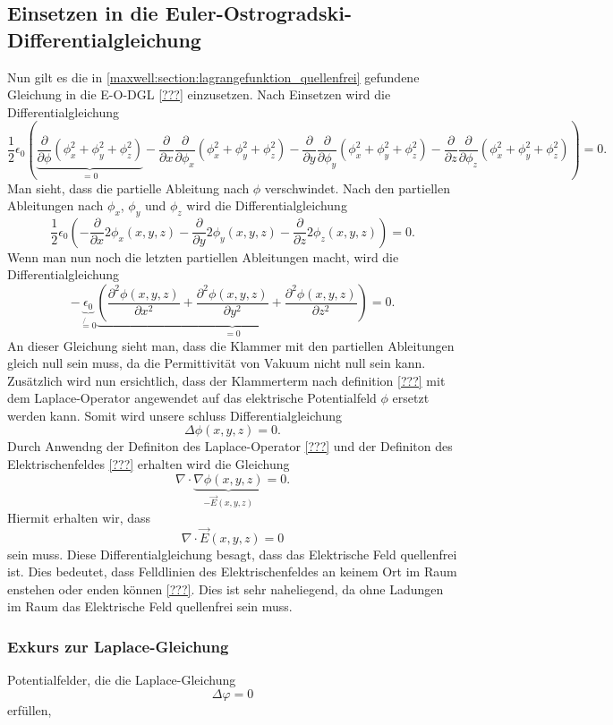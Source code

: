 \subsection{Einsetzen in die Euler-Ostrogradski-Differentialgleichung}
Nun gilt es die in \eqref{maxwell:section:lagrangefunktion_quellenfrei} gefundene Gleichung in die E-O-DGL \ref{???} einzusetzen.
Nach Einsetzen wird die Differentialgleichung
\[
\frac{1}{2}\epsilon_0\left(\underbrace{\frac{\partial}{\partial\phi}\left(\phi_x^2 + \phi_y^2 + \phi_z^2\right)}_{=0} - \frac{\partial}{\partial x}\frac{\partial}{\partial \phi_x}\left(\phi_x^2 + \phi_y^2 + \phi_z^2\right) - 
\frac{\partial}{\partial y}\frac{\partial}{\partial \phi_y}\left(\phi_x^2 + \phi_y^2 + \phi_z^2\right) - 
\frac{\partial}{\partial z}\frac{\partial}{\partial \phi_z}\left(\phi_x^2 + \phi_y^2 + \phi_z^2\right)\right)
=
0.
\]
Man sieht, dass die partielle Ableitung nach $\phi$ verschwindet.
Nach den partiellen Ableitungen nach $\phi_x$, $\phi_y$ und $\phi_z$ wird die Differentialgleichung
\[
\frac{1}{2}\epsilon_0\left(-\frac{\partial}{\partial x}2\phi_x(x,y,z) - \frac{\partial}{\partial y}2\phi_y(x,y,z) - \frac{\partial}{\partial z}2\phi_z(x,y,z)\right)
=
0.
\]
Wenn man nun noch die letzten partiellen Ableitungen macht, wird die Differentialgleichung
\begin{equation}
	- \underbrace{\epsilon_0}_{\not{=}0}\underbrace{\left(\frac{\partial^2\phi(x,y,z)}{\partial x^2} + \frac{\partial^2\phi(x,y,z)}{\partial y^2} + \frac{\partial^2\phi(x,y,z)}{\partial z^2}\right)}_{=0}
	=
	0.
	\label{maxwell:section:laplace_gleichung_1}
\end{equation}
An dieser Gleichung sieht man, dass die Klammer mit den partiellen Ableitungen gleich null sein muss, da die Permittivität von Vakuum nicht null sein kann.
Zusätzlich wird nun ersichtlich, dass der Klammerterm nach definition \ref{???} mit dem Laplace-Operator angewendet auf das elektrische Potentialfeld $\phi$ ersetzt werden kann.
Somit wird unsere schluss Differentialgleichung
\begin{equation}
	\Delta\phi(x,y,z)
	=
	0.
	\label{maxwell:section:laplace_gleichung_2}
\end{equation}
Durch Anwendng der Definiton des Laplace-Operator \ref{???} und der Definiton des Elektrischenfeldes \ref{???} erhalten wird die Gleichung
\[
\nabla\cdot\underbrace{\nabla\phi(x,y,z)}_{-\vec{E}(x,y,z)}
=
0.
\]
Hiermit erhalten wir, dass
\begin{equation}
	\nabla\cdot\vec{E}(x,y,z)
	=
	0
	\label{maxwell:section:e_feld_quellenfrei}
\end{equation}
sein muss. Diese Differentialgleichung besagt, dass das Elektrische Feld quellenfrei ist.
Dies bedeutet, dass Felldlinien des Elektrischenfeldes an keinem Ort im Raum enstehen oder enden können \ref{???}.
Dies ist sehr naheliegend, da ohne Ladungen im Raum das Elektrische Feld quellenfrei sein muss.

\subsubsection{Exkurs zur Laplace-Gleichung}
Potentialfelder, die die Laplace-Gleichung
\[
\Delta\varphi
=
0
\]
erfüllen, 




